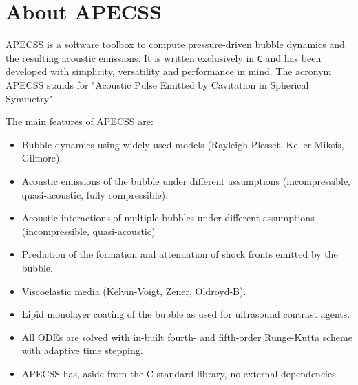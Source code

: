 \chapter{About APECSS}

APECSS is a software toolbox to compute pressure-driven bubble dynamics and the resulting acoustic emissions. It is written exclusively in {\tt C} and has been developed with simplicity, versatility and performance in mind. The acronym APECSS stands for "Acoustic Pulse Emitted by Cavitation in Spherical Symmetry".

The main features of APECSS are:\vspace{-1em}
\begin{itemize}[noitemsep]
\item Bubble dynamics using widely-used models (Rayleigh-Plesset, Keller-Miksis, Gilmore).
\item Acoustic emissions of the bubble under different assumptions (incompressible, quasi-acoustic, fully compressible).
\item Acoustic interactions of multiple bubbles under different assumptions (incompressible, quasi-acoustic)
\item Prediction of the formation and attenuation of shock fronts emitted by the bubble.
\item Viscoelastic media (Kelvin-Voigt, Zener, Oldroyd-B).
\item Lipid monolayer coating of the bubble as used for ultrasound contrast agents.
\item All ODEs are solved with in-built fourth- and fifth-order Runge-Kutta scheme with adaptive time stepping.
\item APECSS has, aside from the C standard library, no external dependencies.
\end{itemize}

